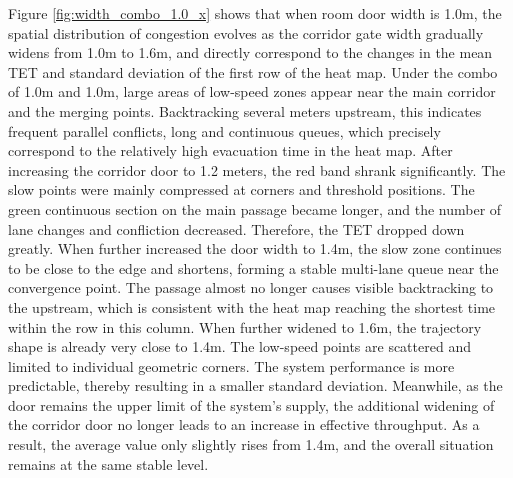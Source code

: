 Figure \ref{fig:width_combo_1.0_x} shows that when room door width is 1.0m, the spatial distribution of congestion evolves as the corridor gate width gradually widens from 1.0m to 1.6m, and directly correspond to the changes in the mean TET and standard deviation of the first row of the heat map. Under the combo of 1.0m and 1.0m, large areas of low-speed zones appear near the main corridor and the merging points. Backtracking several meters upstream, this indicates frequent parallel conflicts, long and continuous queues, which precisely correspond to the relatively high evacuation time in the heat map. After increasing the corridor door to 1.2 meters, the red band shrank significantly. The slow points were mainly compressed at corners and threshold positions. The green continuous section on the main passage became longer, and the number of lane changes and confliction decreased. Therefore, the TET dropped down greatly. When further increased the door width to 1.4m, the slow zone continues to be close to the edge and shortens, forming a stable multi-lane queue near the convergence point. The passage almost no longer causes visible backtracking to the upstream, which is consistent with the heat map reaching the shortest time within the row in this column. When further widened to 1.6m, the trajectory shape is already very close to 1.4m. The low-speed points are scattered and limited to individual geometric corners. The system performance is more predictable, thereby resulting in a smaller standard deviation. Meanwhile, as the door remains the upper limit of the system's supply, the additional widening of the corridor door no longer leads to an increase in effective throughput. As a result, the average value only slightly rises from 1.4m, and the overall situation remains at the same stable level.

